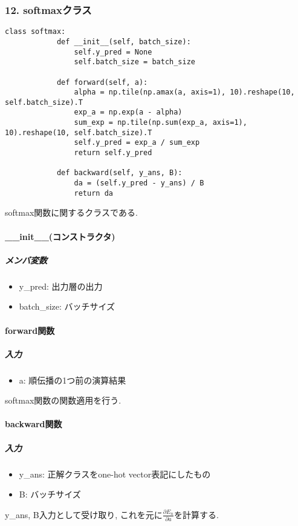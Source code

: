 \documentclass[a4j, titlepage]{jarticle}
\begin{document}
    \subsubsection*{12. softmaxクラス}
        \begin{lstlisting}[caption=ソフトマックス関数の計算 ,label=fuga]
        class softmax:
            def __init__(self, batch_size):
                self.y_pred = None
                self.batch_size = batch_size

            def forward(self, a):
                alpha = np.tile(np.amax(a, axis=1), 10).reshape(10, self.batch_size).T
                exp_a = np.exp(a - alpha)
                sum_exp = np.tile(np.sum(exp_a, axis=1), 10).reshape(10, self.batch_size).T
                self.y_pred = exp_a / sum_exp
                return self.y_pred

            def backward(self, y_ans, B):
                da = (self.y_pred - y_ans) / B
                return da
        \end{lstlisting}
        softmax関数に関するクラスである.
        \paragraph*{\_\_init\_\_(コンストラクタ)}
            \subparagraph*{メンバ変数}
            \begin{itemize}
                \item y\_pred: 出力層の出力
                \item batch\_size: バッチサイズ
            \end{itemize}
        \paragraph*{forward関数}
            \subparagraph*{入力}
            \begin{itemize}
                \item a: 順伝播の1つ前の演算結果
            \end{itemize}
            softmax関数の関数適用を行う.
        \paragraph*{backward関数}
            \subparagraph*{入力}
            \begin{itemize}
                \item y\_ans: 正解クラスをone-hot vector表記にしたもの
                \item B: バッチサイズ
            \end{itemize}
            y\_ans, B入力として受け取り, これを元に\(\displaystyle \frac{\partial E_n}{\partial a}\)を計算する.
\end{document}
